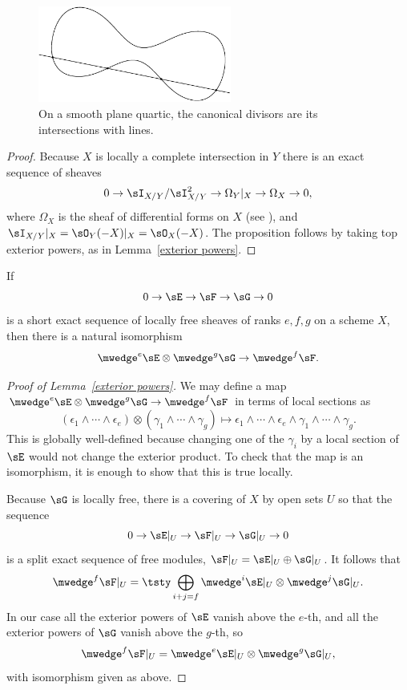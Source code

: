 \begin{figure}
\centerline{\includegraphics[width=2.5in]{"main/Fig02-1"}}
\caption{On a smooth plane quartic, the canonical divisors are its
  intersections with lines.
}\label{canonical of quartic}
\end{figure}


\begin{proof}
 Because $X$ is locally a complete intersection in $Y$ there is an exact sequence of sheaves
 $$
0\to  \sI_{X/Y}/\sI_{X/Y}^{2} \to \Omega_{Y}| _{X} \to \Omega_{X} \to 0
,
 $$
 where $\Omega_{X}$ is the sheaf of differential forms on $X$ (see \cite[Proposition 16.3]{Eisenbud95}), and
$ \sI_{X/Y}|_{X} = \sO_{Y}(-X)|_{X} = \sO_{X}(-X)$. The proposition follows by taking top exterior powers, 
as in Lemma~\ref{exterior powers}.\end{proof}

\begin{lemma}\label{exterior powers}
 If 
$$
0\to \sE \to \sF\to \sG \to 0
$$
is a short exact sequence of locally free sheaves of ranks $e,f,g$ 
 on a scheme $X$, then there is a natural
isomorphism 
$$
\mwedge^e\sE \otimes \mwedge^g \sG \to \mwedge^f\sF.
$$
\end{lemma}

\begin{proof}[Proof of Lemma~\ref{exterior powers}]
 We may define a map
$
\mwedge^e\sE \otimes \mwedge^g \sG \to \mwedge^f\sF
$
in terms of local sections as
$$
(\epsilon_1\wedge\cdots \wedge \epsilon_e) \otimes (\gamma_1\wedge\cdots\wedge \gamma_g)
\mapsto \epsilon_1\wedge\cdots \wedge \epsilon_e\wedge\gamma_1\wedge\cdots\wedge \gamma_g.
$$
This is globally well-defined because changing one of the $\gamma_i$ by a local section of $\sE$ would not
change the exterior product.
To check that the map is an isomorphism, it is enough to show that this is true locally.

Because $\sG$ is locally free, there is a covering of $X$ by open sets $U$
so that the sequence
$$
0\to \sE|_U \to \sF|_U\to \sG|_U \to 0
$$
is a split exact sequence of free modules, $\sF|_U = \sE|_U\oplus \sG|_U$.
It follows that
$$
\mwedge^f\sF|_U = 
\tsty\bigoplus\limits_{i+j = f} \mwedge^i \sE|_U \otimes \mwedge^j\sG|_U.
$$
In our case all the exterior powers of $\sE$ vanish above the $e$-th, and all the 
exterior powers of $\sG$ vanish above the $g$-th, so 
$$
\mwedge^f\sF|_U =  \mwedge^e \sE|_U \otimes \mwedge^g\sG|_U,
$$
with isomorphism given as above.
\end{proof}



